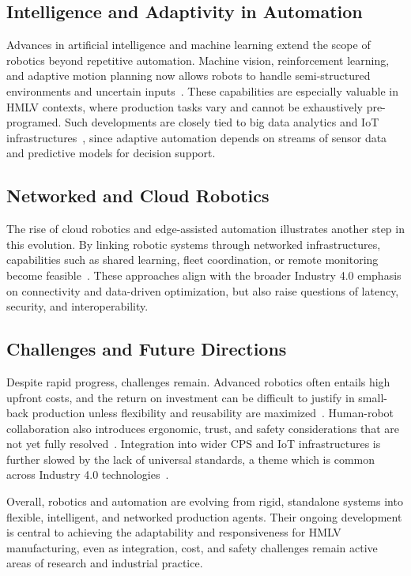 \subsection{Intelligence and Adaptivity in Automation}

Advances in artificial intelligence and machine learning extend the scope of robotics beyond repetitive automation. Machine vision, reinforcement learning, and adaptive motion planning now allows robots to handle semi-structured environments and uncertain inputs~\cite{kragic-interactive-collaborative-robots-challenges-and}. These capabilities are especially valuable in HMLV contexts, where production tasks vary and cannot be exhaustively pre-programed. Such developments are closely tied to big data analytics and IoT infrastructures~\cite{LEE-2015-a-cps-for-indsutry40-based-manufacturing-systems,xu-industry-40-state-of-the-art-and-future-trends}, since adaptive automation depends on streams of sensor data and predictive models for decision support.

\subsection{Networked and Cloud Robotics}

The rise of cloud robotics and edge-assisted automation illustrates another step in this evolution. By linking robotic systems through networked infrastructures, capabilities such as shared learning, fleet coordination, or remote monitoring become feasible~\cite{kehow-a-survey-of-research-on-cloud-robotics-and-automation}. These approaches align with the broader Industry 4.0 emphasis on connectivity and data-driven optimization, but also raise questions of latency, security, and interoperability.

\subsection{Challenges and Future Directions}

Despite rapid progress, challenges remain. Advanced robotics often entails high upfront costs, and the return on investment can be difficult to justify in small-back production unless flexibility and reusability are maximized~\cite{bortolini-reconfigurable-manufacturing-systems-literature-review}. Human-robot collaboration also introduces ergonomic, trust, and safety considerations that are not yet fully resolved~\cite{villani-survey-on-human-robot-collaboration-in-industrial-settings}. Integration into wider CPS and IoT infrastructures is further slowed by the lack of universal standards, a theme which is common across Industry 4.0 technologies~\cite{monsori-cpps-roots-expectations-rnd-challenges,xu-industry-40-state-of-the-art-and-future-trends}.

Overall, robotics and automation are evolving from rigid, standalone systems into flexible, intelligent, and networked production agents. Their ongoing development is central to achieving the adaptability and responsiveness for HMLV manufacturing, even as integration, cost, and safety challenges remain active areas of research and industrial practice.